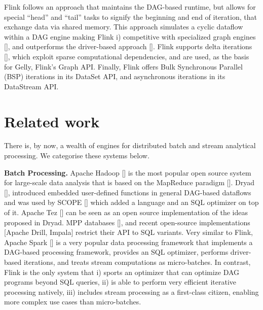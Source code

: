 \documentclass{sig-alternate}
\begin{document}
Flink follows an approach that maintains the DAG-based runtime, but allows for special ``head'' and ``tail'' tasks to signify the beginning and end of iteration, that exchange data via shared memory. This approach simulates a cyclic dataflow within a DAG engine making Flink i) competitive with specialized graph engines [], and outperforms the driver-based approach []. Flink supports delta iterations [], which exploit sparse computational dependencies, and are used, as the basis for Gelly, Flink's Graph API. Finally, Flink offers Bulk Synchronous Parallel (BSP) iterations in its DataSet API, and asynchronous iterations in its DataStream API.


\section{Related work}

There is, by now, a wealth of engines for distributed batch and stream analytical processing. We categorise these systems below. 

\textbf{Batch Processing.} Apache Hadoop [] is the most popular open source system for large-scale data analysis that is based on the MapReduce paradigm []. Dryad [], introduced embedded user-defined functions in general DAG-based dataflows and was used by SCOPE [] which added a language and an SQL optimizer on top of it. Apache Tez [] can be seen as an open source implementation of the ideas proposed in Dryad. MPP databases [], and recent open-source implementations [Apache Drill, Impala] restrict their API to SQL variants. Very similar to Flink, Apache Spark [] is a very popular data processing framework that implements a DAG-based processing framework, provides an SQL optimizer, performs driver-based iterations, and treats stream computations as micro-batches. In contrast, Flink is the only system that i) sports an optimizer that can optimize DAG programs beyond SQL queries, ii) is able to perform very efficient iterative processing natively, iii)  includes stream processing as a first-class citizen, enabling more complex use cases than micro-batches.
\end{document}
